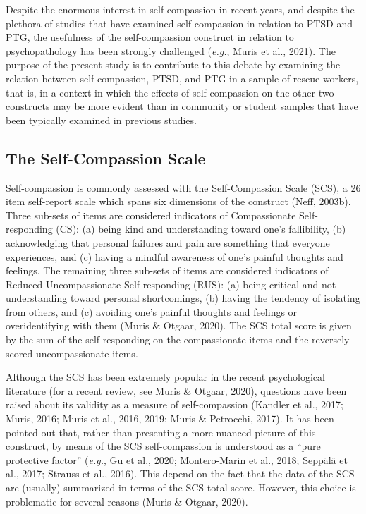 \documentclass[
  english,
  man,floatsintext]{apa7}
\begin{document}
Despite the enormous interest in self-compassion in recent years, and despite the plethora of studies that have examined self-compassion in relation to PTSD and PTG, the usefulness of the self-compassion construct in relation to psychopathology has been strongly challenged (\emph{e.g.}, Muris et al., 2021). The purpose of the present study is to contribute to this debate by examining the relation between self-compassion, PTSD, and PTG in a sample of rescue workers, that is, in a context in which the effects of self-compassion on the other two constructs may be more evident than in community or student samples that have been typically examined in previous studies.

\hypertarget{the-self-compassion-scale}{%
\subsection{The Self-Compassion Scale}\label{the-self-compassion-scale}}

Self-compassion is commonly assessed with the Self-Compassion Scale (SCS), a 26 item self-report scale which spans six dimensions of the construct (Neff, 2003b). Three sub-sets of items are considered indicators of Compassionate Self-responding (CS): (a) being kind and understanding toward one's fallibility, (b) acknowledging that personal failures and pain are something that everyone experiences, and (c) having a mindful awareness of one's painful thoughts and feelings. The remaining three sub-sets of items are considered indicators of Reduced Uncompassionate Self-responding (RUS): (a) being critical and not understanding toward personal shortcomings, (b) having the tendency of isolating from others, and (c) avoiding one's painful thoughts and feelings or overidentifying with them (Muris \& Otgaar, 2020). The SCS total score is given by the sum of the self-responding on the compassionate items and the reversely scored uncompassionate items.

Although the SCS has been extremely popular in the recent psychological literature (for a recent review, see Muris \& Otgaar, 2020), questions have been raised about its validity as a measure of self-compassion (Kandler et al., 2017; Muris, 2016; Muris et al., 2016, 2019; Muris \& Petrocchi, 2017). It has been pointed out that, rather than presenting a more nuanced picture of this construct, by means of the SCS self-compassion is understood as a ``pure protective factor'' (\emph{e.g.}, Gu et al., 2020; Montero-Marin et al., 2018; Seppälä et al., 2017; Strauss et al., 2016). This depend on the fact that the data of the SCS are (usually) summarized in terms of the SCS total score. However, this choice is problematic for several reasons (Muris \& Otgaar, 2020).
\end{document}
